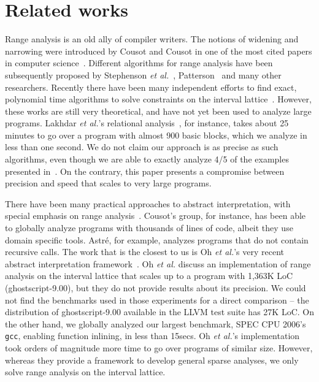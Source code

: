 \documentclass{llncs}
\begin{document}
\section{Related works}
\label{sec:rel}

Range analysis is an old ally of compiler writers.
The notions of widening and narrowing were introduced by Cousot and Cousot in
one of the most cited papers in computer science~\cite{Cousot77}.
Different algorithms for range analysis have been subsequently proposed
by Stephenson {\em et al.}~\cite{Stephenson00}, Patterson~\cite{Patterson95}
and many other researchers.
Recently there have been many independent efforts to find exact, polynomial
time algorithms to solve constraints on the interval
lattice~\cite{Gawlitza09,Costan05,Lakhdar11,Su04,Su05}.
However, these works are still very theoretical, and have not yet been used to
analyze large programs.
Lakhdar {\em et al.}'s relational analysis~\cite{Lakhdar11}, for instance, takes
about 25 minutes to go over a program with almost 900 basic blocks, which we
analyze in less than one second.
We do not claim our approach is as precise as such algorithms, even though we
are able to exactly analyze 4/5 of the examples presented in~\cite{Lakhdar11}.
On the contrary, this paper presents a compromise between precision and speed
that scales to very large programs.

There have been many practical approaches to abstract interpretation,
with special emphasis on range analysis~\cite{Blanchet03,Jung05,Cousot09}.
Cousot's group, for instance, has been able to globally analyze programs with
thousands of lines of code, albeit they use domain specific tools.
Astr\'{e}, for example, analyzes programs that do not contain recursive calls.
The work that is the closest to us is Oh {\em et al.}'s very recent abstract
interpretation framework~\cite{Oh12}.
Oh {\em et al.} discuss an implementation of range analysis on the interval
lattice that scales up to a program with 1,363K LoC (ghostscript-9.00), but
they do not provide results about its precision.
We could not find the benchmarks used in those experiments for a
direct comparison -- the distribution of ghostscript-9.00 available in the
LLVM test suite has 27K LoC.
On the other hand, we globally analyzed our largest benchmark, SPEC CPU 2006's
\texttt{gcc}, enabling function inlining, in less than 15secs.
Oh {\em et al.}'s implementation took orders of magnitude more time to go over
programs of similar size.
However, whereas they provide a framework to develop general sparse analyses, we
only solve range analysis on the interval lattice.
\end{document}
